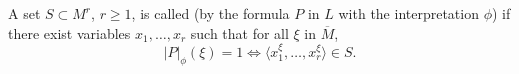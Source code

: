 A set $S \subset M^r$, $r \geqslant 1$, is called  (by the formula $P$ in $L$ with the interpretation $\phi$) if there exist variables $x_1, \ldots, x_r$ such that for all $\xi$ in $\overline{M}$,
$$|P|_\phi(\xi) = 1 \iff \langle x_1^\xi, \ldots, x_r^\xi \rangle \in S.$$
